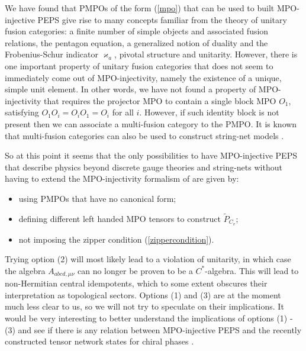 \documentclass[12 pt]{article}
\begin{document}
We have found that PMPOs of the form (\ref{mpo}) that can be used to built MPO-injective PEPS give rise to many concepts familiar from the theory of unitary fusion categories: a finite number of simple objects and associated fusion relations, the pentagon equation, a generalized notion of duality and the Frobenius-Schur indicator $\varkappa_a$, pivotal structure and unitarity. However, there is one important property of unitary fusion categories that does not seem to immediately come out of MPO-injectivity, namely the existence of a unique, simple unit element. In other words, we have not found a property of MPO-injectivity that requires the projector MPO to contain a single block MPO $O_1$, satisfying $O_1O_i = O_iO_1 = O_i$ for all $i$. However, if such identity block is not present then we can associate a multi-fusion category to the PMPO. It is known that multi-fusion categories can also be used to construct string-net models \cite{EnrichingLevinWen}.

So at this point it seems that the only possibilities to have MPO-injective PEPS that describe physics beyond discrete gauge theories and string-nets without having to extend the MPO-injectivity formalism of \cite{MPOpaper} are given by:
\begin{itemize}
    \item[(1)] using PMPOs that have no canonical form;
    \item[(2)] defining different left handed MPO tensors to construct $\tilde{P}_{C_v}$;
    \item[(3)] not imposing the zipper condition (\ref{zippercondition}).
\end{itemize}
Trying option (2) will most likely lead to a violation of unitarity, in which case the algebra $A_{abcd,\mu\nu}$ can no longer be proven to be a $C^*$-algebra. This will lead to non-Hermitian central idempotents, which to some extent obscures their interpretation as topological sectors. Options (1) and (3) are at the moment much less clear to us, so we will not try to speculate on their implications. It would be very interesting to better understand the implications of options (1) - (3) and see if there is any relation between MPO-injective PEPS and the recently constructed tensor network states for chiral phases \cite{chiral1,chiral2}.
\end{document}
